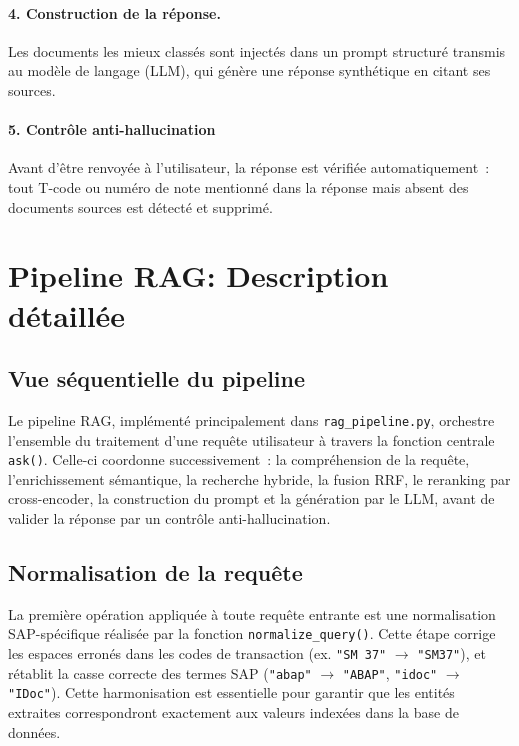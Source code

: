 \paragraph{4. Construction de la réponse.}
Les documents les mieux classés sont injectés dans un prompt structuré transmis au modèle de langage (LLM), qui génère une réponse synthétique en citant ses sources.

\paragraph{5. Contrôle anti-hallucination}
Avant d'être renvoyée à l'utilisateur, la réponse est vérifiée automatiquement~: tout T-code ou numéro de note mentionné dans la réponse mais absent des documents sources est détecté et supprimé.

\section{Pipeline RAG: Description détaillée}

\subsection{Vue séquentielle du pipeline}

Le pipeline RAG, implémenté principalement dans \texttt{rag\_pipeline.py}, orchestre l'ensemble du traitement d'une requête utilisateur à travers la fonction centrale \texttt{ask()}. Celle-ci coordonne successivement~: la compréhension de la requête, l'enrichissement sémantique, la recherche hybride, la fusion RRF, le reranking par cross-encoder, la construction du prompt et la génération par le LLM, avant de valider la réponse par un contrôle anti-hallucination.

\subsection{Normalisation de la requête}

La première opération appliquée à toute requête entrante est une normalisation SAP-spécifique réalisée par la fonction \texttt{normalize\_query()}. Cette étape corrige les espaces erronés dans les codes de transaction (ex. \texttt{"SM 37"} $\rightarrow$ \texttt{"SM37"}), et rétablit la casse correcte des termes SAP (\texttt{"abap"} $\rightarrow$ \texttt{"ABAP"}, \texttt{"idoc"} $\rightarrow$ \texttt{"IDoc"}). Cette harmonisation est essentielle pour garantir que les entités extraites correspondront exactement aux valeurs indexées dans la base de données.

